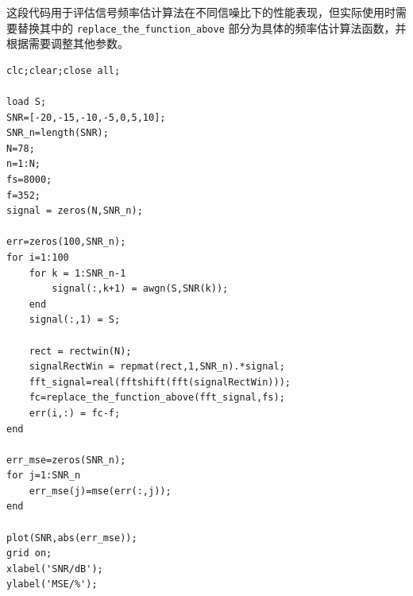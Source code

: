 \documentclass[a4paper,12pt]{article}
\begin{document}
这段代码用于评估信号频率估计算法在不同信噪比下的性能表现，但实际使用时需要替换其中的 \texttt{replace\_the\_function\_above} 部分为具体的频率估计算法函数，并根据需要调整其他参数。

\begin{lstlisting}
clc;clear;close all;

load S;
SNR=[-20,-15,-10,-5,0,5,10];
SNR_n=length(SNR);
N=78;
n=1:N;
fs=8000;
f=352;
signal = zeros(N,SNR_n);

err=zeros(100,SNR_n);
for i=1:100
    for k = 1:SNR_n-1
        signal(:,k+1) = awgn(S,SNR(k));
    end
    signal(:,1) = S;

    rect = rectwin(N);
    signalRectWin = repmat(rect,1,SNR_n).*signal; 
    fft_signal=real(fftshift(fft(signalRectWin)));
    fc=replace_the_function_above(fft_signal,fs);
    err(i,:) = fc-f;
end

err_mse=zeros(SNR_n);
for j=1:SNR_n
    err_mse(j)=mse(err(:,j));
end

plot(SNR,abs(err_mse));
grid on;
xlabel('SNR/dB');
ylabel('MSE/%');


\end{lstlisting}

\newpage


\end{document}
